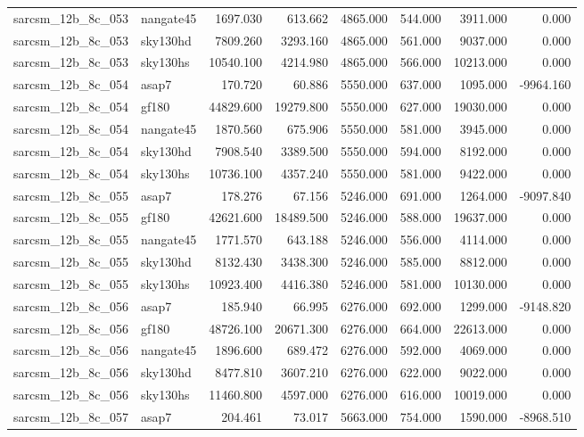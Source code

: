 \begin{tabular}{llrrrrrr}
sarcsm\_12b\_8c\_053 & nangate45 & 1697.030 & 613.662 & 4865.000 & 544.000 & 3911.000 & 0.000 \\
sarcsm\_12b\_8c\_053 & sky130hd & 7809.260 & 3293.160 & 4865.000 & 561.000 & 9037.000 & 0.000 \\
sarcsm\_12b\_8c\_053 & sky130hs & 10540.100 & 4214.980 & 4865.000 & 566.000 & 10213.000 & 0.000 \\
sarcsm\_12b\_8c\_054 & asap7 & 170.720 & 60.886 & 5550.000 & 637.000 & 1095.000 & -9964.160 \\
sarcsm\_12b\_8c\_054 & gf180 & 44829.600 & 19279.800 & 5550.000 & 627.000 & 19030.000 & 0.000 \\
sarcsm\_12b\_8c\_054 & nangate45 & 1870.560 & 675.906 & 5550.000 & 581.000 & 3945.000 & 0.000 \\
sarcsm\_12b\_8c\_054 & sky130hd & 7908.540 & 3389.500 & 5550.000 & 594.000 & 8192.000 & 0.000 \\
sarcsm\_12b\_8c\_054 & sky130hs & 10736.100 & 4357.240 & 5550.000 & 581.000 & 9422.000 & 0.000 \\
sarcsm\_12b\_8c\_055 & asap7 & 178.276 & 67.156 & 5246.000 & 691.000 & 1264.000 & -9097.840 \\
sarcsm\_12b\_8c\_055 & gf180 & 42621.600 & 18489.500 & 5246.000 & 588.000 & 19637.000 & 0.000 \\
sarcsm\_12b\_8c\_055 & nangate45 & 1771.570 & 643.188 & 5246.000 & 556.000 & 4114.000 & 0.000 \\
sarcsm\_12b\_8c\_055 & sky130hd & 8132.430 & 3438.300 & 5246.000 & 585.000 & 8812.000 & 0.000 \\
sarcsm\_12b\_8c\_055 & sky130hs & 10923.400 & 4416.380 & 5246.000 & 581.000 & 10130.000 & 0.000 \\
sarcsm\_12b\_8c\_056 & asap7 & 185.940 & 66.995 & 6276.000 & 692.000 & 1299.000 & -9148.820 \\
sarcsm\_12b\_8c\_056 & gf180 & 48726.100 & 20671.300 & 6276.000 & 664.000 & 22613.000 & 0.000 \\
sarcsm\_12b\_8c\_056 & nangate45 & 1896.600 & 689.472 & 6276.000 & 592.000 & 4069.000 & 0.000 \\
sarcsm\_12b\_8c\_056 & sky130hd & 8477.810 & 3607.210 & 6276.000 & 622.000 & 9022.000 & 0.000 \\
sarcsm\_12b\_8c\_056 & sky130hs & 11460.800 & 4597.000 & 6276.000 & 616.000 & 10019.000 & 0.000 \\
sarcsm\_12b\_8c\_057 & asap7 & 204.461 & 73.017 & 5663.000 & 754.000 & 1590.000 & -8968.510 \\

\end{tabular}
